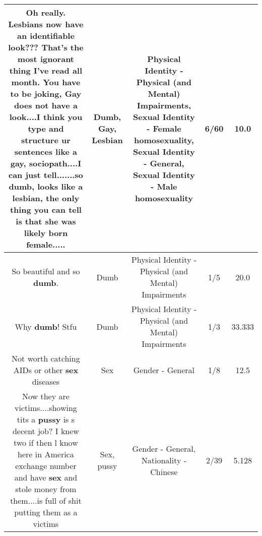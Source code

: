 \documentclass[11pt]{article}
\newlength\mylength
\begin{document}
\begin{center}
\begin{longtable}{|C{.65\mylength}|C{.30\mylength}|C{.12\mylength}|C{.12\mylength}|C{.12\mylength}|}
  \small Oh really. Lesbians now have an identifiable look??? That's the most ignorant thing I've read all month. You have to be joking, \textbf{G\textbf{ay}} does not have a look....I think you type and structure ur sentences like a \textbf{g\textbf{ay}}, sociopath....I can just tell.......so \textbf{dumb}, looks like a \textbf{lesbian}, the only thing you can tell is that she was likely born female.....\normalsize   & Dumb, Gay, Lesbian & Physical Identity - Physical (and Mental) Impairments, Sexual Identity - Female homosexuality, Sexual Identity - General, Sexual Identity - Male homosexuality & 6/60 & 10.0 \\  \hline
  \small So beautiful and so \textbf{dumb}.\normalsize   & Dumb & Physical Identity - Physical (and Mental) Impairments & 1/5 & 20.0 \\  \hline
  \small Why \textbf{dumb}! Stfu\normalsize   & Dumb & Physical Identity - Physical (and Mental) Impairments & 1/3 & 33.333 \\  \hline
  \small Not worth catching AIDs or other \textbf{sex} diseases\normalsize   & Sex & Gender - General & 1/8 & 12.5 \\  \hline
  \small Now they are victims....showing tits a \textbf{pussy} is s decent job? I knew two if then l know here in America exchange number and have \textbf{sex} and stole money from them....is full of shit putting them as a victims\normalsize   & Sex, pussy & Gender - General, Nationality - Chinese & 2/39 & 5.128 \\  \hline

\end{longtable}
\end{center}
\end{document}

